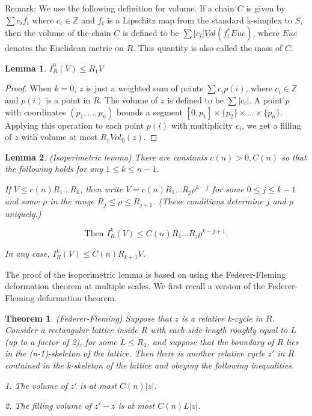 \documentclass{amsart}
\newtheorem{theorem}{Theorem}
\newtheorem*{theorem 1}{Theorem 1}
\newtheorem*{theorem 2}{Theorem 2}
\newtheorem*{theorem 3}{Theorem 3}
\newtheorem{lemma}{Lemma}[section]
\numberwithin{equation}{section}
\begin{document}
Remark: We use the following definition for volume.  If a chain
$C$ is given by $\sum c_i f_i$ where $c_i \in \mathbb{Z}$ and
$f_i$ is a Lipschitz map from the standard k-simplex to $S$, then
the volume of the chain $C$ is defined to be $\sum |c_i|
Vol(f_i^* Euc)$, where $Euc$ denotes the Euclidean metric on $R$. 
This quantity is also called the mass of $C$.  

\begin{lemma} \label{isoperimetriclemma0}
$I_R^0(V) \le R_1 V$
\end{lemma}

\begin{proof} When $k=0$, $z$ is just a weighted sum of
points $\sum c_i p(i)$, where $c_i \in \mathbb{Z}$ and $p(i)$ is
a point in $R$.  The volume of $z$ is defined to be $\sum |c_i|$. 
A point $p$ with coordinates $(p_1, ..., p_n)$ bounds a segment
$[0, p_1] \times \{ p_2 \} \times ... \times \{ p_n \}$. 
Applying this operation to each point $p(i)$ with multiplicity
$c_i$, we get a filling of $z$ with volume at most $R_1 Vol_0(z)$.
\end{proof}


\begin{lemma} \label{isoperimetriclemma} (Isoperimetric lemma) There are constants $c(n) > 0, C(n)$ so that the
following holds for any $1 \le k \le n-1$.

If $V \le c(n) R_1 ... R_k$, then write $V = c(n) R_1 ... R_j
\rho^{k-j}$ for some $0 \le j \le k-1$ and some $\rho$ in the
range $R_j \le \rho \le R_{j+1}$. (These conditions determine $j$
and $\rho$ uniquely.)

$$\textrm{Then } I^k_R(V) \le C(n) R_1 ... R_j \rho^{k-j+1}.$$

In any case, $I^k_R(V) \le C(n) R_{k+1} V$.

\end{lemma}

The proof of the isoperimetric lemma is based on using the Federer-Fleming deformation theorem at multiple scales.  We first recall a version of the Federer-Fleming deformation theorem.  


\begin{theorem} (Federer-Fleming) Suppose that $z$ is a relative k-cycle in $R$.
Consider a rectangular lattice inside $R$ with each side-length
roughly equal to $L$ (up to a factor of 2), for some $L \le R_1$,
and suppose that the boundary of $R$ lies in the (n-1)-skeleton
of the lattice.  Then there is another relative cycle $z'$ in $R$
contained in the k-skeleton of the lattice and obeying the 
following inequalities.

1. The volume of $z'$ is at most $C(n) |z|$.

2. The filling volume of $z' - z$ is at most $C(n) L |z|$.

\end{theorem}
\end{document}
